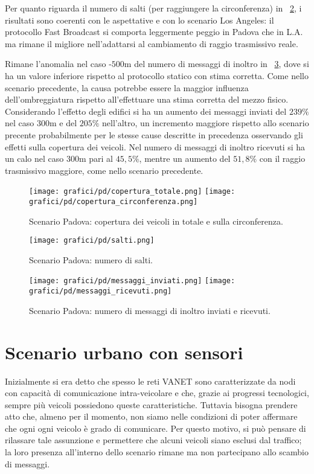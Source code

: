 Per quanto riguarda il numero di salti (per raggiungere la circonferenza) in \figurename~\ref{fig:risultati-padova-salti},
i risultati sono coerenti con le aspettative e con lo scenario Los Angeles:
il protocollo Fast Broadcast si comporta leggermente peggio in Padova che in L.A.
ma rimane il migliore nell'adattarsi al cambiamento di raggio trasmissivo reale.

Rimane l'anomalia nel caso \statica{}-$500$m del numero di messaggi di inoltro in \figurename~\ref{fig:risultati-padova-messaggi},
dove si ha un valore inferiore rispetto al protocollo statico con stima corretta.
Come nello scenario precedente, la causa potrebbe essere la maggior influenza dell'ombreggiatura rispetto
all'effettuare una stima corretta del mezzo fisico.
Considerando l'effetto degli edifici si ha un aumento dei messaggi inviati del $239\%$ nel caso $300$m e del $205\%$ nell'altro,
un incremento maggiore rispetto allo scenario precente probabilmente per le stesse cause
descritte in precedenza osservando gli effetti sulla copertura dei veicoli.
Nel numero di messaggi di inoltro ricevuti si ha un calo nel caso $300$m pari al $45,5\%$,
mentre un aumento del $51,8\%$ con il raggio trasmissivo maggiore, come nello scenario precedente.
%
\begin{figure}[htbp]
	\centering
		\texttt{[image: grafici/pd/copertura\_totale.png]}
		\texttt{[image: grafici/pd/copertura\_circonferenza.png]}
\caption{Scenario Padova: copertura dei veicoli in totale e sulla circonferenza.\label{fig:risultati-padova-copertura}}
\end{figure}
%
\begin{figure}[htbp]
	\centering
		\texttt{[image: grafici/pd/salti.png]}
\caption{Scenario Padova: numero di salti.\label{fig:risultati-padova-salti}}
\end{figure}
%
\begin{figure}[htbp]
	\centering
		\texttt{[image: grafici/pd/messaggi\_inviati.png]}
		\texttt{[image: grafici/pd/messaggi\_ricevuti.png]}
\caption{Scenario Padova: numero di messaggi di inoltro inviati e ricevuti.\label{fig:risultati-padova-messaggi}}
\end{figure}
\clearpage
%
%
\section{Scenario urbano con sensori}\label{sec:configurazione-sensori}
Inizialmente si era detto che spesso le reti VANET sono caratterizzate da nodi con capacità di comunicazione
intra-veicolare e che, grazie ai progressi tecnologici, sempre più veicoli possiedono queste caratteristiche.
Tuttavia bisogna prendere atto che, almeno per il momento, non siamo nelle condizioni
di poter affermare che ogni ogni veicolo è grado di comunicare.
Per questo motivo, si può pensare di rilassare tale assunzione e permettere che alcuni veicoli
siano esclusi dal traffico; la loro presenza all'interno dello scenario rimane ma non partecipano allo scambio di messaggi.

